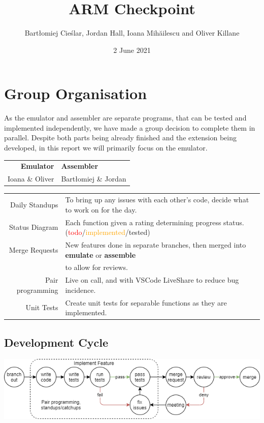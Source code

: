 \documentclass[11pt]{article}
\begin{document}
\title{ARM Checkpoint}
\author{Bartłomiej Cieślar, Jordan Hall, Ioana Mihăilescu and Oliver Killane}
\date{2 June 2021}

\maketitle

\section{Group Organisation}
    As the emulator and assembler are separate programs, that can be tested and implemented independently, we have made a group decision to complete them in parallel. Despite both parts being already finished and the extension being developed, in this report we will primarily focus on the emulator.
    \begin{center}
        \begin{tabular}{ r | l }
            \textbf{Emulator} & \textbf{Assembler} \\
            Ioana \& Oliver & Bartłomiej \& Jordan \\
        \end{tabular}
    \end{center}
    \begin{center}
        \begin{tabular}{r l}
            Daily Standups & To bring up any issues with each other's code, decide what to work on for the day. \\
            Status Diagram & Each function given a rating determining progress status. (\textcolor{red}{todo}/\textcolor{orange}{implemented}/\textcolor{OliveGreen}{tested}) \\
            Merge Requests & New features done in separate branches, then merged into \textbf{emulate} or \textbf{assemble}\\&to allow for reviews. \\
            Pair programming & Live on call, and with VSCode LiveShare to reduce bug incidence. \\
            Unit Tests & Create unit tests for separable functions as they are implemented. \\
        \end{tabular}
    \end{center}
    \subsection*{Development Cycle}
        \begin{center}
            \includegraphics[width = \textwidth]{development cycle}
        \end{center}
\end{document}
